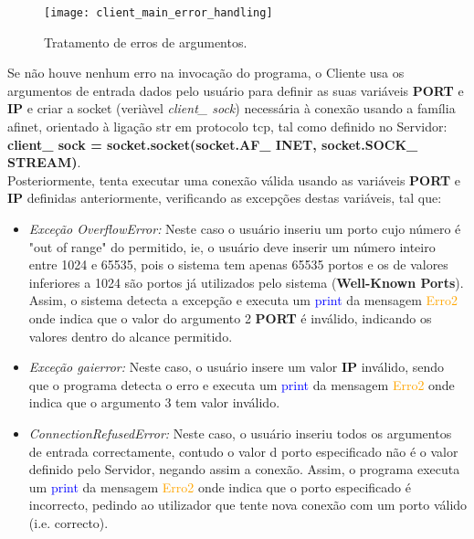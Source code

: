 \begin{figure}[H]
	\centering
	\texttt{[image: client\_main\_error\_handling]}
	\caption{Tratamento de erros de argumentos.\\}
	\label{fig:client_main_error_handling}
\end{figure} 

\clearpage

Se não houve nenhum erro na invocação do programa, o Cliente usa os argumentos de entrada dados pelo usuário para definir as suas variáveis \textbf{PORT} e \textbf{IP} e criar a socket (veriàvel \textsl{client\_ sock}) necessária à conexão usando a família \ac{afinet}, orientado à ligação \ac{str} em protocolo \ac{tcp}, tal como definido no Servidor: \textbf{client\_ sock = socket.socket(socket.AF\_ INET, socket.SOCK\_ STREAM)}. \\
Posteriormente, tenta executar uma conexão válida usando as variáveis \textbf{PORT} e \textbf{IP} definidas anteriormente, verificando as excepções destas variáveis, tal que:

\begin{itemize}
	\item\textsl{Exceção OverflowError:} Neste caso o usuário inseriu um porto cujo número é "out of range" do permitido, ie, o usuário deve inserir um número inteiro entre 1024 e 65535, pois o sistema tem apenas 65535 portos e os de valores inferiores a 1024 são portos já utilizados pelo sistema (\textbf{Well-Known Ports}). Assim, o sistema detecta a excepção e executa um \textcolor{blue}{print} da mensagem \textcolor{orange}{Erro2} onde indica que o valor do argumento 2 \textbf{PORT} é inválido, indicando os valores dentro do alcance permitido. 
	\item\textsl{Exceção gaierror:}  Neste caso, o usuário insere um valor \textbf{IP} inválido, sendo que o programa detecta o erro e executa um \textcolor{blue}{print} da mensagem \textcolor{orange}{Erro2} onde indica que o argumento 3  tem valor inválido.
	\item\textsl{ConnectionRefusedError:} Neste caso, o usuário inseriu todos os argumentos de entrada correctamente, contudo o valor d porto especificado não é o valor definido pelo Servidor, negando assim a conexão. Assim, o programa executa um \textcolor{blue}{print} da mensagem \textcolor{orange}{Erro2} onde indica que o porto especificado é incorrecto, pedindo ao utilizador que tente nova conexão com um porto válido (i.e. correcto).		 
\end{itemize}

